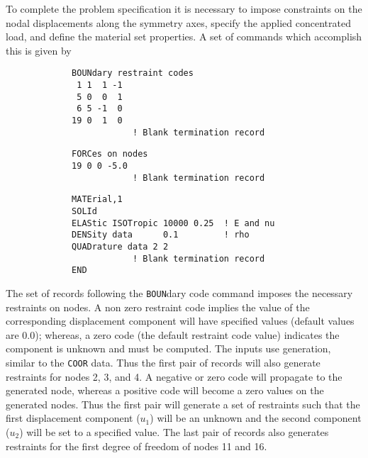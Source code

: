 To complete the problem specification it is necessary to impose constraints
on the nodal displacements along the symmetry axes, specify the applied
concentrated load, and define the material set properties.  A set of commands
which accomplish this is given by
\begin{verbatim}
             BOUNdary restraint codes
              1 1  1 -1
              5 0  0  1
              6 5 -1  0
             19 0  1  0
                         ! Blank termination record
\end{verbatim}
\begin{verbatim}
             FORCes on nodes
             19 0 0 -5.0
                         ! Blank termination record
\end{verbatim}
\begin{verbatim}
             MATErial,1
             SOLId
             ELAStic ISOTropic 10000 0.25  ! E and nu
             DENSity data      0.1         ! rho
             QUADrature data 2 2
                         ! Blank termination record
             END
\end{verbatim}
The set of records following the {\tt BOUN}dary code command
imposes the necessary restraints on nodes. A non zero
restraint code implies the value of the corresponding displacement component
will have specified values (default values are 0.0);
whereas, a zero code (the default
restraint code value) indicates the component is unknown and must be computed.
The inputs use generation, similar to the {\tt COOR} data.  Thus the first
pair of records will also generate restraints for nodes 2, 3, and 4.  A negative
or zero code will propagate to the generated node, whereas a positive code
will become a zero values on the generated nodes.  Thus the first pair
will generate a set of restraints such that the first displacement
component ($u_1$) will be an unknown and the second component ($u_2$) will
be set to a specified value.
The last pair of records also generates restraints for the first degree
of freedom of nodes 11 and 16.

